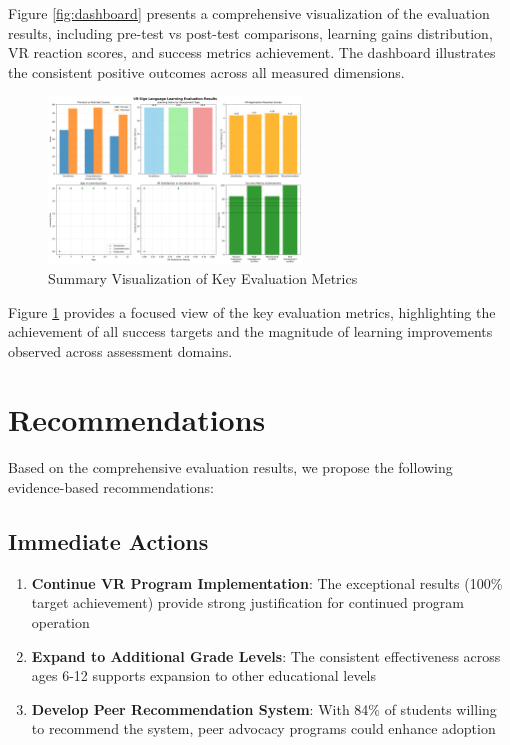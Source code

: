 \documentclass[12pt,a4paper]{article}
\begin{document}
Figure \ref{fig:dashboard} presents a comprehensive visualization of the evaluation results, including pre-test vs post-test comparisons, learning gains distribution, VR reaction scores, and success metrics achievement. The dashboard illustrates the consistent positive outcomes across all measured dimensions.

\begin{figure}[H]
\centering
\includegraphics[width=0.6\textwidth]{vr_evaluation_results.png}
\caption{Summary Visualization of Key Evaluation Metrics}
\label{fig:summary}
\end{figure}

Figure \ref{fig:summary} provides a focused view of the key evaluation metrics, highlighting the achievement of all success targets and the magnitude of learning improvements observed across assessment domains.

\section{Recommendations}

Based on the comprehensive evaluation results, we propose the following evidence-based recommendations:

\subsection{Immediate Actions}

\begin{enumerate}
    \item \textbf{Continue VR Program Implementation}: The exceptional results (100\% target achievement) provide strong justification for continued program operation
    
    \item \textbf{Expand to Additional Grade Levels}: The consistent effectiveness across ages 6-12 supports expansion to other educational levels
    
    \item \textbf{Develop Peer Recommendation System}: With 84\% of students willing to recommend the system, peer advocacy programs could enhance adoption
\end{enumerate}
\end{document}
